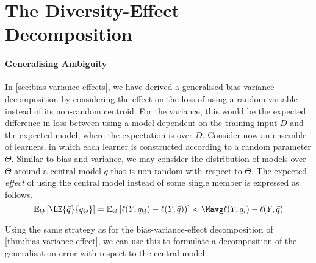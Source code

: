 \documentclass[../main.tex]{subfiles}
\begin{document}
\section{The Diversity-Effect Decomposition}
\label{sec:bias-variance-diversity-decomp}

\paragraph{Generalising Ambiguity} In \cref{sec:bias-variance-effects}, we have derived a generalised bias-variance decomposition by considering the effect on the loss of using a random variable instead of its non-random centroid. 
For the variance, this would be the expected difference in loss between using a model dependent on the training input $D$ and the expected model, where the expectation is over $D$. 
Consider now an ensemble of learners, in which each learner is constructed according to a random parameter $\Theta$. Similar to bias and variance, we may consider the distribution of models over $\Theta$ around a central model $\bar{q}$ that is non-random with respect to $\Theta$. 
The expected \textit{effect} of using the central model instead of some single member is expressed as follows.
$$
\mathbb{E}_{\Theta} \left[
\LE{\bar{q}}{q_\Theta}
\right]
=
\mathbb{E}_{\Theta}\left[   \ell(Y, q_{\Theta}) -  \ell(Y, \bar{q})) \right] \approx \Mavg \ell(Y, q_i) - \ell(Y, \bar{q})
$$


Using the same strategy as for the bias-variance-effect decomposition of \cref{thm:bias-variance-effect}, we can use this to formulate a decomposition of the generalisation error with respect to the central model.


\end{document}
